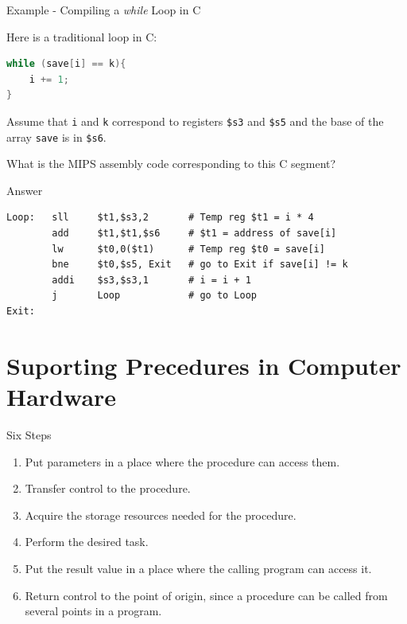 \begin{frame}[fragile]{Example - Compiling a \textit{while} Loop in C}
\begin{flushleft}
Here is a traditional loop in C:
\begin{lstlisting}[language=c, keywordstyle=\color{purple}\textbf]
while (save[i] == k){
    i += 1;
}
\end{lstlisting}

Assume that \texttt{i} and \texttt{k} correspond to registers \texttt{\$s3} and \texttt{\$s5} and the base of the
array \texttt{save} is in \texttt{\$s6}.

What is the MIPS assembly code corresponding to this
C segment?
\end{flushleft}
\end{frame}

\begin{frame}[fragile]{Answer}
\begin{lstlisting}[keywords={sll, add, lw, bne, addi, j}, keywordstyle=\color{purple}\textbf]
Loop:   sll     $t1,$s3,2       # Temp reg $t1 = i * 4
        add     $t1,$t1,$s6     # $t1 = address of save[i]
        lw      $t0,0($t1)      # Temp reg $t0 = save[i]
        bne     $t0,$s5, Exit   # go to Exit if save[i] != k
        addi    $s3,$s3,1       # i = i + 1
        j       Loop            # go to Loop
Exit:
\end{lstlisting}
\end{frame}

\section{Suporting Precedures in Computer Hardware}
\begin{frame}{Six Steps}
\begin{enumerate}
\item Put parameters in a place where the procedure can access them.
\item Transfer control to the procedure.
\item Acquire the storage resources needed for the procedure. 
\item Perform the desired task.
\item Put the result value in a place where the calling program can access it. 
\item Return control to the point of origin, since a procedure can be called from several points in a program.
\end{enumerate}
\end{frame}

